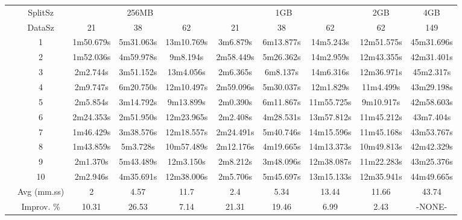 \begin{tabularx}{\linewidth}{*{10}{c|}}
\cline{2-10}
& SplitSz 
& \multicolumn{3}{c|}{256MB} & \multicolumn{3}{c|}{1GB}  & \multicolumn{1}{c|}{2GB} & \multicolumn{1}{c|}{4GB} \\
\cline{2-10}
& DataSz 
& 21 & 38 & 62 & 21 & 38 & 62 & 62 & 149 \\
\cline{2-10}
& 1
& 1m50.679s & 5m31.063s & 13m10.769s & 3m6.879s & 6m13.877s & 14m5.243s & 12m51.575s & 45m31.696s \\
\cline{2-10}
& 2
& 1m52.036s & 4m59.978s & 9m8.194s & 2m58.449s & 5m26.362s & 14m2.959s & 12m43.355s & 42m31.401s \\
\cline{2-10}
& 3
& 2m2.744s & 3m51.152s & 13m4.056s & 2m6.365s & 6m8.137s & 14m6.316s & 12m36.971s & 45m2.317s \\
\cline{2-10}
& 4
& 2m9.747s & 6m20.750s & 12m10.497s & 2m59.096s & 5m30.037s & 12m1.829s & 11m4.499s & 43m29.198s \\
\cline{2-10}
& 5
& 2m5.854s & 3m14.792s & 9m13.899s & 2m0.390s & 6m11.867s & 11m55.725s & 9m10.917s & 42m58.603s \\
\cline{2-10}
& 6
& 2m24.353s & 2m51.950s & 12m23.965s & 2m2.408s & 4m28.531s & 13m57.812s & 11m45.212s & 43m7.404s \\
\cline{2-10}
& 7
& 1m46.429s & 3m38.576s & 12m18.557s & 2m24.491s & 5m40.746s & 14m15.596s & 11m45.168s & 43m53.767s \\
\cline{2-10}
& 8
& 1m43.859s & 5m3.728s & 10m57.489s & 2m12.176s & 4m19.665s & 14m13.373s & 10m49.813s & 42m42.329s \\
\cline{2-10}
& 9
& 2m1.370s & 5m43.489s & 12m3.150s & 2m8.212s & 3m48.096s & 12m38.087s & 11m22.283s & 43m25.376s \\
\cline{2-10}
& 10
& 2m2.946s & 4m35.691s & 12m38.006s & 2m5.706s & 5m45.697s & 13m15.133s & 12m35.941s & 44m49.665s \\
\cline{2-10}
& Avg (mm.ss)
& 2 & 4.57 & 11.7 & 2.4 & 5.34 & 13.44 & 11.66 & 43.74 \\
\cline{2-10}
& Improv. \%
& 10.31 & 26.53 & 7.14 & 21.31 & 19.46 & 6.99 & 2.43 & -NONE- \\
\cline{2-10}
\end{tabularx}
